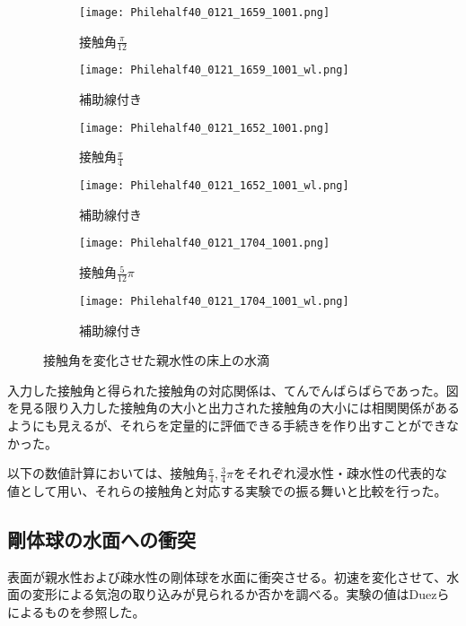 \documentclass[]{jsarticle}
\begin{document}
\begin{figure}[H]
  \centering
  \begin{subfigure}{0.45\columnwidth}
    \centering
    \texttt{[image: Philehalf40\_0121\_1659\_1001.png]}
    \caption{接触角$\frac{\pi}{12}$}
    \label{fig:phile_pi6}
  \end{subfigure}
  \begin{subfigure}{0.45\columnwidth}
    \centering
    \texttt{[image: Philehalf40\_0121\_1659\_1001\_wl.png]}
    \caption{補助線付き}
    \label{fig:phile_pi6wl}
  \end{subfigure}

  \begin{subfigure}{0.45\columnwidth}
    \centering
    \texttt{[image: Philehalf40\_0121\_1652\_1001.png]}
    \caption{接触角$\frac{\pi}{4}$}
    \label{fig:phile_pi4}
  \end{subfigure}
  \begin{subfigure}{0.45\columnwidth}
    \centering
    \texttt{[image: Philehalf40\_0121\_1652\_1001\_wl.png]}
    \caption{補助線付き}
    \label{fig:phile_pi4wl}
  \end{subfigure}
  \begin{subfigure}{0.45\columnwidth}
    \centering
    \texttt{[image: Philehalf40\_0121\_1704\_1001.png]}
    \caption{接触角$\frac{5}{12}\pi$}
    \label{fig:phile_pi3}
  \end{subfigure}
  \begin{subfigure}{0.45\columnwidth}
    \centering
    \texttt{[image: Philehalf40\_0121\_1704\_1001\_wl.png]}
    \caption{補助線付き}
    \label{fig:phile_pi3wl}
  \end{subfigure}

  \caption{接触角を変化させた親水性の床上の水滴}
\end{figure}



入力した接触角と得られた接触角の対応関係は、てんでんばらばらであった。図を見る限り入力した接触角の大小と出力された接触角の大小には相関関係があるようにも見えるが、それらを定量的に評価できる手続きを作り出すことができなかった。

以下の数値計算においては、接触角$\frac{\pi}{4},\frac{3}{4}\pi$をそれぞれ浸水性・疎水性の代表的な値として用い、それらの接触角と対応する実験での振る舞いと比較を行った。


\newpage
\subsection{剛体球の水面への衝突}
表面が親水性および疎水性の剛体球を水面に衝突させる。初速を変化させて、水面の変形による気泡の取り込みが見られるか否かを調べる。実験の値はDuez\cite{Duez2007}らによるものを参照した。
\end{document}
